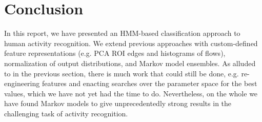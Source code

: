 \documentclass{article}
\begin{document}
\section{Conclusion}

In this report, we have presented an HMM-based classification approach to human activity recognition. We extend previous approaches with custom-defined feature representations (e.g. PCA ROI edges and histograms of flows), normalization of output distributions, and Markov model ensembles. As alluded to in the previous section, there is much work that could still be done, e.g. re-engineering features and enacting searches over the parameter space for the best values, which we have not yet had the time to do. Nevertheless, on the whole we have found Markov models to give unprecedentedly strong results in the challenging task of activity recognition.



\end{document}
